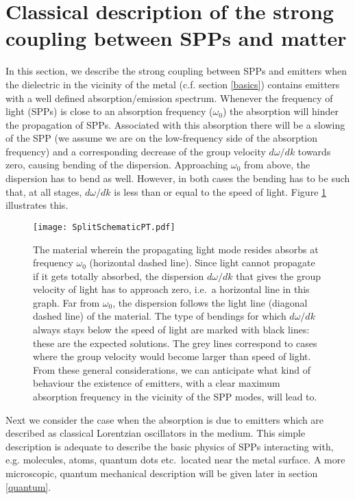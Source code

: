 \documentclass[12pt]{iopart}
\begin{document}
\section{Classical description of the strong coupling between SPPs and matter} \label{classical}

In this section, we describe the strong coupling between SPPs and emitters when the dielectric in the vicinity of the metal (c.f. section \ref{basics}) contains emitters with a well defined absorption/emission spectrum. Whenever the frequency of light (SPPs) is close to an absorption frequency ($\omega_0$) the absorption will hinder the propagation of SPPs. Associated with this absorption there will be a slowing of the SPP (we assume we are on the low-frequency side of the absorption frequency) and a corresponding decrease of the group velocity $d\omega/dk$ towards zero, causing bending of the dispersion. Approaching $\omega_0$ from above, the dispersion has to bend as well. However, in both cases the bending has to be such that, at all stages, $d\omega/dk$ 
is less than or equal to the speed of light. Figure \ref{basicBendingPT} illustrates this.

\begin{figure}
\texttt{[image: SplitSchematicPT.pdf]}
\caption{The material wherein the propagating light mode resides absorbs at frequency $\omega_0$ (horizontal dashed line). Since light cannot propagate if it gets totally absorbed, the dispersion $d\omega/dk$ that gives the group velocity of light has to approach zero, i.e.\  a horizontal line in this graph. Far from $\omega_0$, the dispersion follows the light line (diagonal dashed line) of the material. The type of bendings for which $d\omega/dk$ always stays below the speed of light are marked with black lines: these are the expected solutions. The grey lines correspond to cases where the group velocity would become larger than speed of light. From these general considerations, we can anticipate what kind of behaviour the existence of emitters, with a clear maximum absorption frequency in the vicinity of the SPP modes, will lead to.} 
\label{basicBendingPT}
\end{figure}


Next we consider the case when the absorption is due to emitters which are described as classical Lorentzian oscillators in the medium. This simple description is adequate to describe the basic physics of SPPs interacting with, e.g. molecules, atoms, quantum dots etc.\ located near the metal surface. A more microscopic, quantum mechanical description will be given later in section \ref{quantum}.
\end{document}
